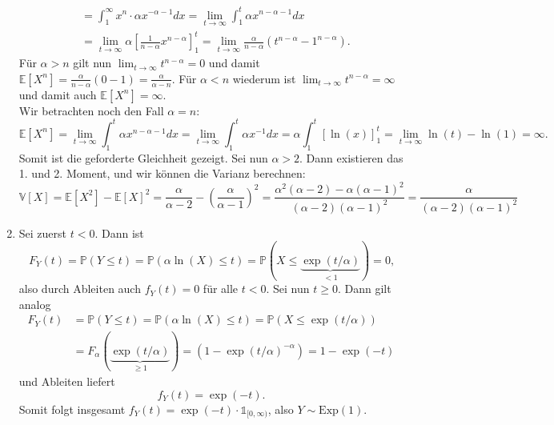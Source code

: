 \documentclass{article}
\def\to{\ensuremath{\rightarrow}} %
\begin{document}
\begin{enumerate}[label=(\alph*)]
\begin{align*}
		                      & = \int_{1}^{\infty} x^n \cdot \alpha x^{-\alpha - 1} dx = \lim_{t \to \infty} \int_{1}^{t} \alpha x^{n - \alpha - 1} dx                                                             \\
		                      & = \lim_{t \to \infty} \alpha \left[\frac{1}{n - \alpha} x^{n - \alpha}\right]_1^t = \lim_{t \to \infty} \frac{\alpha}{n - \alpha} \left(t^{n-\alpha} - 1^{n-\alpha}\right) \text{.}
	      \end{align*}
	      Für $\alpha > n$ gilt nun $\lim_{t \to \infty} t^{n - \alpha} = 0$ und damit $\mathds{E}[X^n] = \frac{\alpha}{n - \alpha} (0 - 1) = \frac{\alpha}{\alpha - n}$. Für $\alpha < n$ wiederum ist $\lim_{t \to \infty} t^{n - \alpha} = \infty$ und damit auch $\mathds{E}[X^n] = \infty$. \\
	      Wir betrachten noch den Fall $\alpha = n$:
	      \begin{equation*}
		      \mathds{E}[X^n] = \lim_{t \to \infty} \int_{1}^{t} \alpha x^{n - \alpha - 1} dx = \lim_{t \to \infty} \int_{1}^t \alpha x^{-1} dx = \alpha \int_{1}^t \left[\ln(x)\right]_1^t = \lim_{t \to \infty} \ln(t)  - \ln(1) = \infty\text{.}
	      \end{equation*}
	      Somit ist die geforderte Gleichheit gezeigt. Sei nun $\alpha > 2$. Dann existieren das 1. und 2. Moment, und wir können die Varianz berechnen:
	      \begin{equation*}
		      \mathds{V}[X] = \mathds{E}[X^2] - \mathds{E}[X]^2 = \frac{\alpha}{\alpha - 2} - \left(\frac{\alpha}{\alpha - 1}\right)^2 = \frac{\alpha^2(\alpha-2) - \alpha (\alpha-1)^2}{(\alpha - 2)(\alpha - 1)^2} = \frac{\alpha}{(\alpha - 2)(\alpha - 1)^2}
	      \end{equation*}
	\item Sei zuerst $t < 0$. Dann ist
	      \begin{equation*}
		      F_Y(t) = \mathds{P}(Y \leq t) = \mathds{P}(\alpha \ln(X) \leq t) = \mathds{P}(X \leq \underbrace{\exp(t/\alpha)}_{<1}) = 0\text{,}
	      \end{equation*}
	      also durch Ableiten auch $f_Y(t) = 0$ für alle $t<0$. Sei nun $t \geq 0$. Dann gilt analog
	      \begin{align*}
		      F_Y(t) & = \mathds{P}(Y \leq t) = \mathds{P}(\alpha \ln(X) \leq t) = \mathds{P}(X \leq \exp(t/\alpha))    \\
		             & = F_\alpha(\underbrace{\exp(t/\alpha)}_{\geq 1}) = (1 - \exp(t/\alpha)^{-\alpha}) = 1 - \exp(-t)
	      \end{align*}
	      und Ableiten liefert
	      \begin{equation*}
		      f_Y(t) = \exp(-t)\text{.}
	      \end{equation*}
	      Somit folgt insgesamt $f_Y(t) = \exp(-t) \cdot \mathds{1}_{[0, \infty)}$, also $Y \sim \mathrm{Exp}(1)$.
\end{enumerate}
\end{document}
